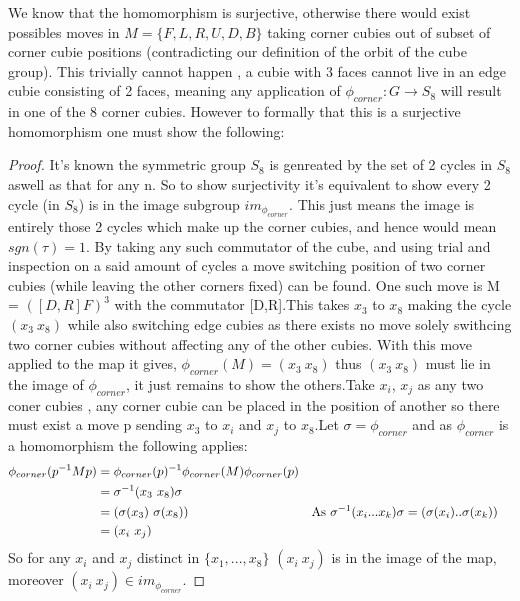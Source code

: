 \documentclass{article}
\begin{document}
We know that the homomorphism is surjective, otherwise there would exist possibles moves in $M= \{{F,L,R,U,D,B}\}$ taking corner cubies out of subset of corner cubie positions (contradicting our definition of the orbit of the cube group). This trivially cannot happen , a cubie with 3 faces cannot live in an edge cubie consisting of 2 faces, meaning any application of $\phi_{corner}: G \rightarrow S_{8}$ will result in one of the 8 corner cubies. However to formally that this is a surjective homomorphism one must show the following: 
\begin{proof}
It's known the symmetric group $S_8$ is genreated by the set of 2 cycles in $S_8$ aswell as that for any n. So to show surjectivity it's equivalent to show every 2 cycle (in $S_8$) is in the image subgroup $im_{\phi_{corner}}$. This just means the image is entirely those 2 cycles which make up the corner cubies, and hence would mean $sgn(\tau) = 1$.
By taking any such commutator of the cube, and using trial and inspection on a said amount of cycles a move switching position of two corner cubies (while leaving the other corners fixed) can be found. One such move is M = $([D,R]F)^{3}$ with the commutator [D,R].This takes $x_3$ to $x_8$ making the cycle $(x_3\ x_8)$ while also switching edge cubies as there exists no move solely swithcing two corner cubies without affecting any of the other cubies. With this move applied to the map it gives, $\phi_{corner}(M) = (x_3\ x_8)$ thus $(x_3\ x_8)$ must lie in the image of $\phi_{corner}$, it just remains to show the others.\newline Take $x_i$, $x_j$ as any two coner cubies , any corner cubie can be placed in the position of another so there must exist a move p sending $x_3$ to $x_i$ and $x_j$ to $x_8$.Let $\sigma =\phi_{corner}$ and as $\phi_{corner}$ is a homomorphism the following applies:
\begin{align*}
\phi_{corner}(p^{-1}Mp) &= \phi_{corner}(p)^{-1}\phi_{corner}(M)\phi_{corner}(p)\\
		&= \sigma^{-1}(x_3\ x_8)\sigma			\\
		&= (\sigma(x_3)\ \sigma(x_8)) &&\text{As $\sigma^{-1}(x_i ... x_ k)\sigma = (\sigma(x_i) .. \sigma(x_k))$} \\
		&= (x_i\ x_j) &&\qedhere
\end{align*}
So for any $x_i$ and $x_j$ distinct in $\{x_1,...,x_8\}$ $(x_i\ x_j)$ is in the image of the map, moreover $(x_i\ x_j) \in im_{\phi_{corner}}$.
\end{proof}
\end{document}
